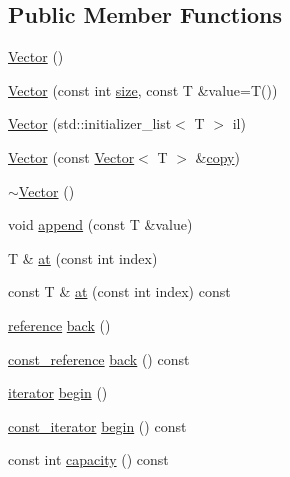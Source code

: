 \subsection*{Public Member Functions}
\begin{DoxyCompactItemize}
\item 
\hyperlink{classprism_1_1_vector_a0081b629c0ab4d85d6847a8cf382f1af}{Vector} ()
\item 
\hyperlink{classprism_1_1_vector_a61d37ac01e42fca59cdf320804a2a7ed}{Vector} (const int \hyperlink{classprism_1_1_vector_ac6ff3296683e76da61d48bcc15e4f175}{size}, const T \&value=T())
\item 
\hyperlink{classprism_1_1_vector_af40c40b61dbfabdb69251abd1518773c}{Vector} (std\+::initializer\+\_\+list$<$ T $>$ il)
\item 
\hyperlink{classprism_1_1_vector_a6df8c0a101ff496b688f4937ec1f13e6}{Vector} (const \hyperlink{classprism_1_1_vector}{Vector}$<$ T $>$ \&\hyperlink{namespaceprism_ae776f4cd825f79e7af1cf6ee1d90a209}{copy})
\item 
\hyperlink{classprism_1_1_vector_a80f2790bb6011dd40739bff844fd3154}{$\sim$\+Vector} ()
\item 
void \hyperlink{classprism_1_1_vector_a690b3be3b217aab2842a5b9b7b0ab4dd}{append} (const T \&value)
\item 
T \& \hyperlink{classprism_1_1_vector_ad47f765360ae83602b645afe23a65541}{at} (const int index)
\item 
const T \& \hyperlink{classprism_1_1_vector_accf072a45a5be33b09d3210df16f52d5}{at} (const int index) const 
\item 
\hyperlink{classprism_1_1_vector_a8ccf98342707efbed82918a44be97438}{reference} \hyperlink{classprism_1_1_vector_a1e19cfd05c60f96f31fb4feba79fe4eb}{back} ()
\item 
\hyperlink{classprism_1_1_vector_a75325487acaa0f63496c110e5a5632bb}{const\+\_\+reference} \hyperlink{classprism_1_1_vector_abae5f68837ada40afa65d7ff492cc79f}{back} () const 
\item 
\hyperlink{classprism_1_1_vector_aa547779173a63f6f8c9b2887498d10eb}{iterator} \hyperlink{classprism_1_1_vector_a4e1871436d85d42653eddf9cf0dac271}{begin} ()
\item 
\hyperlink{classprism_1_1_vector_acc6ed07e2d7ed5065feec92a83e46fa4}{const\+\_\+iterator} \hyperlink{classprism_1_1_vector_a4cd1ca2ba159fd073127be98b37f6ba2}{begin} () const 
\item 
const int \hyperlink{classprism_1_1_vector_aa6bfbb4672a51177c6fafbd503e90a92}{capacity} () const 

\end{DoxyCompactItemize}
